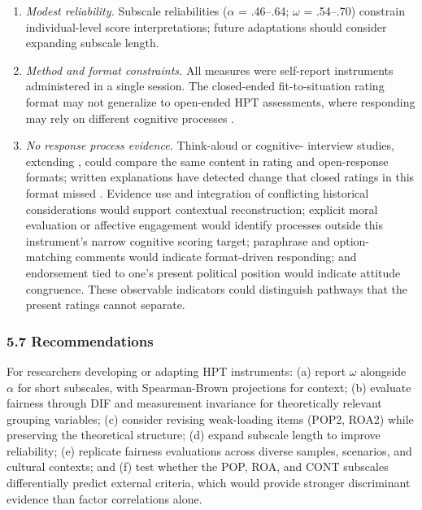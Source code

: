 \documentclass[
  12pt,
]{article}
\newcommand{\Loc}[1]{\linelabel{loc:#1}}
\newcommand{\LocEnd}[1]{\linelabel{loc:#1:end}}
\begin{document}
\begin{enumerate}
\item \emph{Modest reliability.} Subscale reliabilities (\(\alpha\) =
   .46--.64; \(\omega\) = .54--.70) constrain individual-level score
   interpretations; future adaptations should consider expanding subscale
   length.

\item \emph{Method and format constraints.} All measures were
  self-report instruments administered in a single session. The
  closed-ended fit-to-situation rating format may not generalize to open-ended HPT
  assessments, where responding may rely on different cognitive
  processes \citep{Smith2017Cognitive,Smith_et_al2018History}.

\item \Loc{lim8}\emph{No response process evidence.} Think-aloud or cognitive-
  interview studies, extending \citet{Huijgen_et_al2017Toward}, could
  compare the same content in rating and open-response formats; written
  explanations have detected change that closed ratings in this format
  missed \citep{Wilschut_Schiphorst2019One}. Evidence
  use and integration of conflicting historical considerations would
  support contextual reconstruction; explicit moral evaluation or
  affective engagement would identify processes outside this
  instrument's narrow cognitive scoring target; paraphrase and option-
  matching comments would indicate format-driven responding; and
  endorsement tied to one's present political position would indicate
  attitude congruence. These observable indicators could distinguish
  pathways that the present ratings cannot separate.\LocEnd{lim8}

\end{enumerate}

\hypertarget{recommendations}{%
\subsubsection{5.7 Recommendations}\label{recommendations}}

For researchers developing or adapting HPT instruments: (a) report \(\omega\) alongside \(\alpha\) for short subscales, with Spearman-Brown projections for context; (b) evaluate fairness through DIF and measurement invariance for theoretically relevant grouping variables; (c) consider revising weak-loading items (POP2, ROA2) while preserving the theoretical structure; (d) expand subscale length to improve reliability; (e) replicate fairness evaluations across diverse samples, scenarios, and cultural contexts; \Loc{s57-f}and (f) test whether the POP, ROA, and CONT subscales differentially predict external criteria, which would provide stronger discriminant evidence than factor correlations alone.\LocEnd{s57-f}
\end{document}
